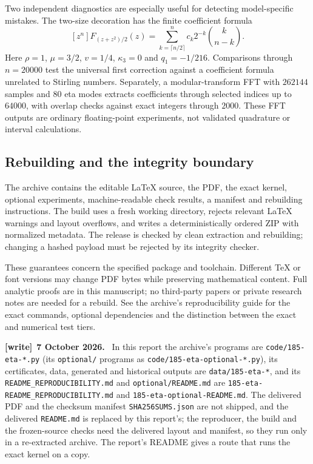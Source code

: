 \documentclass[11pt]{article}
\theoremstyle{definition}\newtheorem{definition}[theorem]{Definition}
\theoremstyle{remark}\newtheorem{remark}[theorem]{Remark}
\newcommand{\file}[1]{\nolinkurl{#1}}
\newenvironment{writenote}[1][]{\par\smallskip\begingroup\small
 \noindent\textbf{[write]}\if\relax\detokenize{#1}\relax\else~\textbf{#1.}\fi\ }%
 {\par\endgroup\smallskip}
\begin{document}
Two independent diagnostics are especially useful for detecting
model-specific mistakes. The two-size decoration has the finite
coefficient formula
\begin{equation}\label{dep:eta:eq:twosize}
 [z^n]F_{(z+z^2)/2}(z)
   =\sum_{k=\lceil n/2\rceil}^{n}
         c_k2^{-k}\binom{k}{n-k}.
\end{equation}
Here $\rho=1$, $\mu=3/2$, $v=1/4$, $\kappa_3=0$ and
$q_1=-1/216$. Comparisons through $n=20000$ test the universal
first correction against a coefficient formula unrelated to
Stirling numbers. Separately, a modular-transform FFT with
$262144$ samples and $80$ eta modes extracts coefficients through
selected indices up to $64000$, with overlap checks against exact
integers through $2000$. These FFT outputs are ordinary floating-point
experiments, not validated quadrature or interval calculations.

\subsection{Rebuilding and the integrity boundary}
The archive contains the editable \LaTeX{} source, the PDF, the exact
kernel, optional experiments, machine-readable check results, a
manifest and rebuilding instructions. The build uses a fresh working
directory, rejects relevant \LaTeX{} warnings and layout overflows,
and writes a deterministically ordered ZIP with normalized metadata.
The release is checked by clean extraction and rebuilding; changing a
hashed payload must be rejected by its integrity checker.

These guarantees concern the specified package and toolchain.
Different \TeX{} or font versions may change PDF bytes while preserving
mathematical content. Full analytic proofs are in this manuscript;
no third-party papers or private research notes are needed for a
rebuild. See the archive's reproducibility guide for the exact commands,
optional dependencies and the distinction between the exact and
numerical test tiers.

\begin{writenote}[7 October 2026]
In this report the archive's programs are \file{code/185-eta-*.py} (its \file{optional/} programs as \file{code/185-eta-optional-*.py}), its certificates, data, generated and historical outputs are \file{data/185-eta-*}, and its \file{README_REPRODUCIBILITY.md} and \file{optional/README.md} are \file{185-eta-README_REPRODUCIBILITY.md} and \file{185-eta-optional-README.md}. The delivered PDF and the checksum manifest \file{SHA256SUMS.json} are not shipped, and the delivered \file{README.md} is replaced by this report's; the reproducer, the build and the frozen-source checks need the delivered layout and manifest, so they run only in a re-extracted archive. The report's README gives a route that runs the exact kernel on a copy.
\end{writenote}
\end{document}
